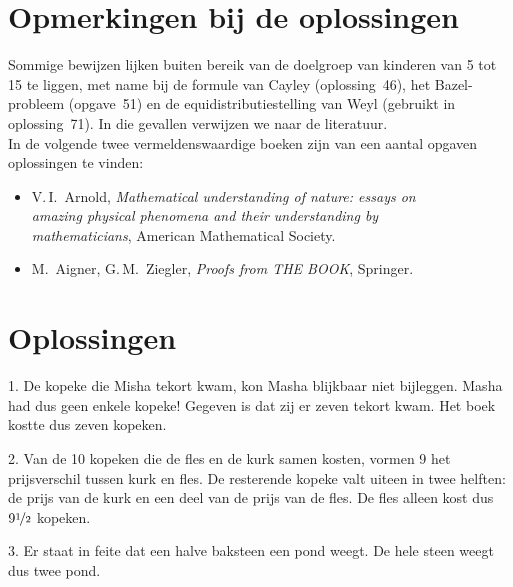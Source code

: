 \cleardoublepage

\section*{Opmerkingen bij de oplossingen}
Sommige bewijzen lijken buiten bereik van de doelgroep van kinderen van 5 tot 15 te liggen, met name bij de formule van Cayley (oplos\-sing~46), het Bazel-probleem (opgave~51) en de equidistributiestelling van Weyl (gebruikt in oplossing~71). In die gevallen verwijzen we naar de literatuur.\\

\noindent In de volgende twee vermeldenswaardige boeken zijn van een aantal opgaven oplossingen te vinden:
\begin{itemize}
    \item V.\,I.~Arnold, \textit{Mathematical understanding of nature: essays on\\amazing physical phenomena and their understanding by\\mathematicians}, American Mathematical Society.
    \item M.~Aigner, G.\,M.~Ziegler, \textit{Proofs from THE BOOK}, Springer.
\end{itemize}

\cleardoublepage

\section*{Oplossingen}

\begin{problem}{1.}
    De kopeke die Misha tekort kwam, kon Masha blijkbaar niet bijleggen. Masha had dus geen enkele kopeke! Gegeven is dat zij er zeven tekort kwam. Het boek kostte dus zeven kopeken.
\end{problem}

\begin{problem}{2.}
    Van de 10 kopeken die de fles en de kurk samen kosten, vormen 9 het prijsverschil tussen kurk en fles. De resterende kopeke valt uiteen in twee helften: de prijs van de kurk en een deel van de prijs van de fles. De fles alleen kost dus $9 \nicefrac{1}{2}$ kopeken.
\end{problem}

\begin{problem}{3.}
    Er staat in feite dat een halve baksteen een pond weegt. De hele steen weegt dus twee pond.
\end{problem}

